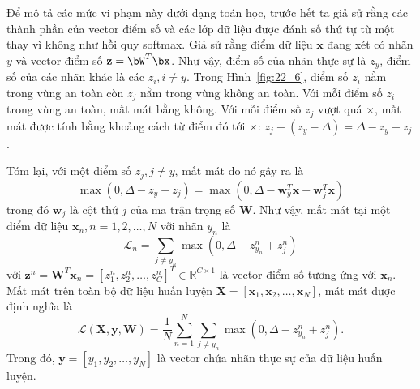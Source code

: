 Để mô tả các mức vi phạm này dưới dạng toán học, trước hết ta giả sử rằng các
thành phần của vector điểm số và các lớp dữ liệu được đánh số thứ tự từ một thay
vì không như hồi quy softmax. Giả sử rằng điểm dữ liệu $\mathbf{x}$ đang xét có
nhãn $y$ và vector điểm số $\mathbf{z} = \bW^T\bx$. Như vậy, điểm số của nhãn
thực sự là $z_y$, điểm số của các nhãn khác là các $z_i, i \neq y$. Trong
Hình~\ref{fig:22_6}, điểm số $z_i$ nằm trong vùng an toàn còn $z_j$ nằm trong
vùng không an toàn. Với mỗi điểm số $z_i$ trong vùng an toàn, mất mát bằng
không. Với mỗi điểm số $z_j$ vượt quá $\times$, mất mát được tính bằng khoảng
cách từ điểm đó tới $\times$: $z_j - (z_y - \Delta) =
    \Delta - z_y + z_j$.


     
Tóm lại, với một điểm số $z_j, j \neq y$, mất mát do nó gây ra là
\begin{equation} 
\label{eqn:22_1}
\max(0, \Delta - z_y + z_j) = \max(0, \Delta - \mathbf{w}_y^T\mathbf{x} + \mathbf{w}_j^T\mathbf{x}) 
\end{equation} 
trong đó $\mathbf{w}_j$ là {cột} thứ $j$ của ma trận trọng số $\mathbf{W}$. 
Như vậy, mất mát tại một điểm dữ liệu $\mathbf{x}_n, n = 1, 2, \dots, N$ vỡi nhãn $y_n$ là
\begin{equation*} 
\mathcal{L}_n = \sum_{j \neq y_n} \max(0, \Delta  - z_{y_n}^n + z_j^n) 
\end{equation*} 
với $\mathbf{z}^n = \mathbf{W}^T\mathbf{x}_n = [z^n_1, z^n_2, \dots,
z^n_C]^T \in \mathbb{R}^{C \times 1}$ là vector điểm số tương ứng với $\mathbf{x}_n$.
Mất mát trên toàn bộ dữ liệu huấn luyện $\mathbf{X} = [\mathbf{x}_1, \mathbf{x}_2, \dots,
\mathbf{x}_N ]$, mát mát được định nghĩa là
\begin{equation} 
\label{eqn:22_2}
\mathcal{L}(\mathbf{X}, \mathbf{y}, \mathbf{W}) = \frac{1}{N}\sum_{n=1}^N \sum_{j \neq y_n} \max(0, \Delta - z_{y_n}^n + z_j^n).
\end{equation} 
Trong đó, $\mathbf{y} = [y_1, y_2, \dots, y_N]$ là vector chứa nhãn thực sự
của dữ liệu huấn luyện.
 
